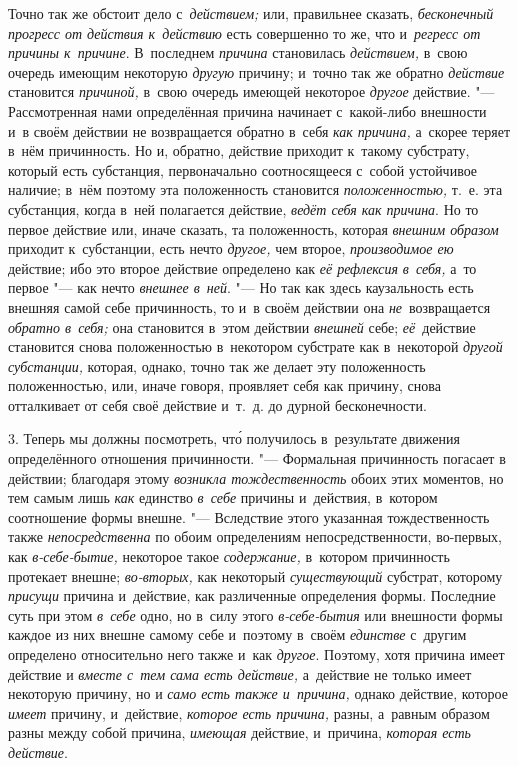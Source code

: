 Точно так же обстоит дело с~{\em действием;} или, правильнее сказать,
{\em бесконечный прогресс от действия к~действию} есть совершенно то же, что
и~{\em регресс от причины к~причине}. В~последнем {\em причина} становилась
{\em действием,} в~свою очередь имеющим некоторую {\em другую} причину; и~точно
так же обратно {\em действие} становится {\em причиной,} в~свою очередь имеющей
некоторое {\em другое} действие. "--- Рассмотренная нами определённая причина
начинает с~какой-либо внешности и~в своём действии не возвращается обратно
в~себя {\em как причина,} а~скорее теряет в~нём причинность. Но и, обратно,
действие приходит к~такому субстрату, который есть субстанция, первоначально
соотносящееся с~собой устойчивое наличие; в~нём поэтому эта положенность
становится {\em положенностью,} т.~е. эта субстанция, когда в~ней полагается
действие, {\em ведёт себя как причина}. Но то первое действие или, иначе
сказать, та положенность, которая {\em внешним образом} приходит к~субстанции,
есть нечто {\em другое,} чем второе, {\em производимое ею} действие; ибо это
второе действие определено как {\em её рефлексия} {\em в~себя,} а~то первое
"--- как нечто {\em внешнее в~ней}. "--- Но так как здесь каузальность есть
внешняя самой себе причинность, то и~в своём действии она {\em не}~возвращается
{\em обратно в~себя;} она становится в~этом действии {\em внешней} себе;
{\em её}~действие становится снова положенностью в~некотором субстрате как
в~некоторой {\em другой субстанции,} которая, однако, точно так же делает эту
положенность положенностью, или, иначе говоря, проявляет себя как причину,
снова отталкивает от себя своё действие и~т.~д. до дурной бесконечности.

3. Теперь мы должны посмотреть, чт\'{о} получилось в~результате движения
определённого отношения причинности. "--- Формальная причинность погасает в
действии; благодаря этому {\em возникла тождественность} обоих этих моментов,
но тем самым лишь {\em как} единство {\em в~себе} причины и~действия, в~котором
соотношение формы внешне. "--- Вследствие этого указанная тождественность также
{\em непосредственна} по обоим определениям непосредственности, во-первых, как
{\em в-себе-бытие,} некоторое такое {\em содержание,} в~котором причинность
протекает внешне; {\em во-вторых,} как некоторый {\em существующий} субстрат,
которому {\em присущи} причина и~действие, как различенные определения формы.
Последние суть при этом {\em в~себе} одно, но в~силу этого {\em в-себе-бытия}
или внешности формы каждое из них внешне самому себе и~поэтому в~своём
{\em единстве} с~другим определено относительно него также и~как {\em другое}.
Поэтому, хотя причина имеет действие и {\em вместе с~тем сама есть действие,}
а~действие не только имеет некоторую причину, но и
{\em само есть также и~причина,} однако действие, которое {\em имеет} причину,
и~действие, {\em которое есть причина,} разны, а~равным образом разны между
собой причина, {\em имеющая} действие, и~причина, {\em которая есть действие}.

